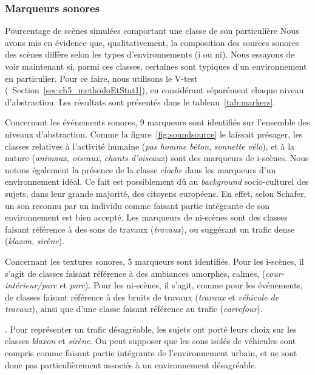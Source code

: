 \subsubsection{Marqueurs sonores}
\label{sec:ch5_marqueurXp1}
Pourcentage de scènes simulées comportant une classe de son particulière
Nous avons mis en évidence que, qualitativement, la composition des sources sonores des scènes diffère selon les types d'environnements (i ou ni). Nous essayons de voir maintenant si, parmi ces classes, certaines sont typiques d'un environnement en particulier. Pour ce faire, nous utilisons le V-test (\cf~Section~\ref{sec:ch5_methodoEtStat1}), en considérant séparément chaque niveau d'abstraction. Les résultats sont présentés dans le tableau~\ref{tab:markers}.

Concernant les événements sonores, 9 marqueurs sont identifiés sur l'ensemble des niveaux d'abstraction. Comme la figure~\ref{fig:soundsource} le laissait présager, les classes relatives à l'activité humaine (\emph{pas homme béton}, \emph{sonnette vélo}), et à la nature (\emph{animaux, oiseaux}, \emph{chants d'oiseaux}) sont des marqueurs de i-scènes. Nous notons également la présence de la classe \emph{cloche} dans les marqueurs d'un environnement idéal. Ce fait est possiblement dû au \emph{background} socio-culturel des sujets, dans leur grande majorité, des citoyens européens. En effet, selon Schafer, un son reconnu par un individu comme faisant partie intégrante de son environnement est bien accepté. Les marqueurs de ni-scènes sont des classes faisant référence à des sons de travaux (\emph{travaux}), ou suggérant un trafic dense (\emph{klaxon}, \emph{sirène}).

Concernant les textures sonores, 5 marqueurs sont identifiés. Pour les i-scènes, il s'agit de classes faisant référence à des ambiances amorphes, calmes, (\emph{cour-intérieur/parc} et \emph{parc}). Pour les ni-scènes, il s'agit, comme pour les événements, de classes faisant référence à des bruits de travaux (\emph{travaux} et \emph{véhicule de travaux}), ainsi que d'une classe faisant référence au trafic (\emph{carrefour}).

. Pour représenter un trafic désagréable, les sujets ont porté leurs choix sur les classes \emph{klaxon} et \emph{sirène}. On peut supposer que les sons isolés de véhicules sont compris comme faisant partie intégrante de l'environnement urbain, et ne sont donc pas particulièrement associés à un environnement désagréable. \\ 

